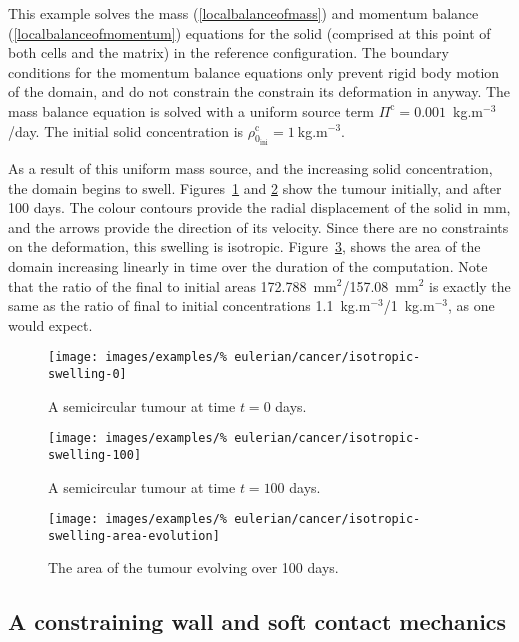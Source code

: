 This example solves the mass (\ref{localbalanceofmass}) and momentum
balance (\ref{localbalanceofmomentum}) equations for the solid
(comprised at this point of both cells and the matrix) in the
reference configuration. The boundary conditions for the momentum
balance equations only prevent rigid body motion of the domain, and do
not constrain the constrain its deformation in anyway. The mass
balance equation is solved with a uniform source term
$\Pi^{\mathrm{c}}=0.001$~kg.m$^{-3}$/day. The initial solid
concentration is $\rho_{0_{\mathrm{ini}}}^{\mathrm{c}}=1~$kg.m$^{-3}$.

As a result of this uniform mass source, and the increasing solid
concentration, the domain begins to
swell. Figures~\ref{tumour-isotropic-swelling-0} and
\ref{tumour-isotropic-swelling-100} show the tumour
initially, and after 100 days. The colour contours provide the
radial displacement of the solid in mm, and the arrows provide the
direction of its velocity. Since there are no constraints on the
deformation, this swelling is
isotropic. Figure~\ref{tumour-isotropic-area-evolution}, shows the area of
the domain increasing linearly in time over the duration of the
computation. Note that the ratio of the final to initial areas
172.788~mm$^2$/157.08~mm$^2$ is exactly the same as the ratio of final
to initial concentrations 1.1~kg.m$^{-3}$/1~kg.m$^{-3}$, as one would
expect.

\begin{figure}[!hptb]
\centering
\texttt{[image: images/examples/\%
eulerian/cancer/isotropic-swelling-0]}
\caption{A semicircular tumour at time $t=0$ days.}
\label{tumour-isotropic-swelling-0}
\end{figure}

\begin{figure}[!hptb]
\centering
\texttt{[image: images/examples/\%
eulerian/cancer/isotropic-swelling-100]}
\caption{A semicircular tumour at time $t=100$ days.}
\label{tumour-isotropic-swelling-100}
\end{figure}

\begin{figure}[!hptb]
\centering
\texttt{[image: images/examples/\%
eulerian/cancer/isotropic-swelling-area-evolution]}
\caption{The area of the tumour evolving over 100 days.}
\label{tumour-isotropic-area-evolution}
\end{figure}

\subsection{A constraining wall and soft contact mechanics}
\label{wall-constraint}

